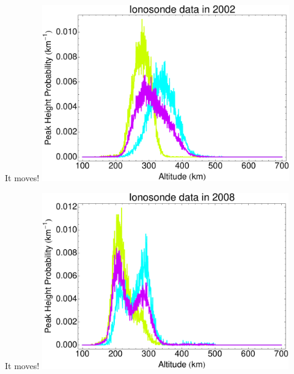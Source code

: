 \documentclass{beamer}
\begin{document}
\begin{frame}{It moves!}
  \includegraphics[height=3.0in]{plot}
\end{frame}

\begin{frame}{It moves!}
  \includegraphics[height=3.0in]{2008}
\end{frame}
\end{document}

